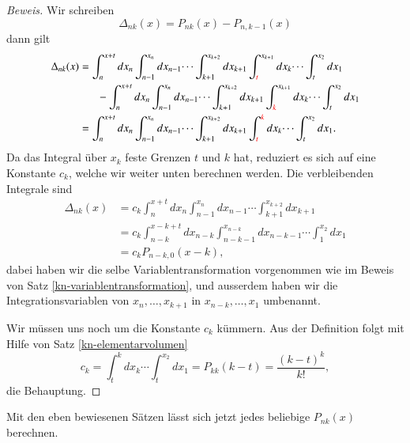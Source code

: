 \begin{proof}[Beweis]
Wir schreiben
\[
\Delta_{nk}(x)= P_{nk}(x)-P_{n,k-1}(x)
\]
dann gilt
\begin{align*}
\Delta_{nk}(x)
&=
\int_n^{x+t}dx_n\int_{n-1}^{x_n}dx_{n-1}\dotsi\int_{k+1}^{x_{k+2}}dx_{k+1}
\int^{x_{k+1}}_{\color{red}t} dx_k\dotsi\int_t^{x_2}dx_1
\\
&\phantom{=}\quad-\int_n^{x+t} dx_n\int_{n-1}^{x_n}dx_{n-1}\dotsi\int_{k+1}^{x_{k+2}}dx_{k+1}
\int^{x_{k+1}}_{\color{red}k} dx_k\dotsi\int_t^{x_2}dx_1
\\
&=
\int_n^{x+t}dx_n\int_{n-1}^{x_n}dx_{n-1}\dotsi\int_{k+1}^{x_{k+2}}dx_{k+1}
\int_{{\color{red}t\mathstrut}}^{\color{red}k}dx_k\dotsi\int_t^{x_2}dx_1.
\end{align*}
Da das Integral über $x_k$ feste Grenzen $t$ und $k$ hat, reduziert es
sich auf eine Konstante $c_k$, welche wir weiter unten berechnen werden.
Die verbleibenden Integrale sind
\begin{align*}
\Delta_{nk}(x)
&=
c_k\int_n^{x+t}dx_n\int_{n-1}^{x_n}dx_{n-1}\dotsi\int_{k+1}^{x_{k+2}}dx_{k+1}
\\
&=
c_k\int_{n-k}^{x-k+t}dx_{n-k}\int_{n-k-1}^{x_{n-k}}dx_{n-k-1}\dotsi\int_1^{x_2}dx_1
\\
&=c_kP_{n-k,0}(x-k),
\end{align*}
dabei haben wir die selbe Variablentransformation vorgenommen wie im
Beweis von Satz \ref{kn-variablentransformation}, und ausserdem haben
wir die Integrationsvariablen von $x_n,\dots,x_{k+1}$ in $x_{n-k},\dots,x_1$
umbenannt.

Wir müssen uns noch um die Konstante $c_k$ kümmern.
Aus der Definition folgt mit Hilfe von Satz \ref{kn-elementarvolumen}
\begin{equation}
c_k = \int_{t}^{k}dx_k\dotsi\int_t^{x_2}dx_1=P_{kk}(k-t)=\frac{(k-t)^k}{k!},
\end{equation}
die Behauptung.
\end{proof}
Mit den eben bewiesenen Sätzen lässt sich jetzt jedes beliebige 
$P_{nk}(x)$ berechnen.

